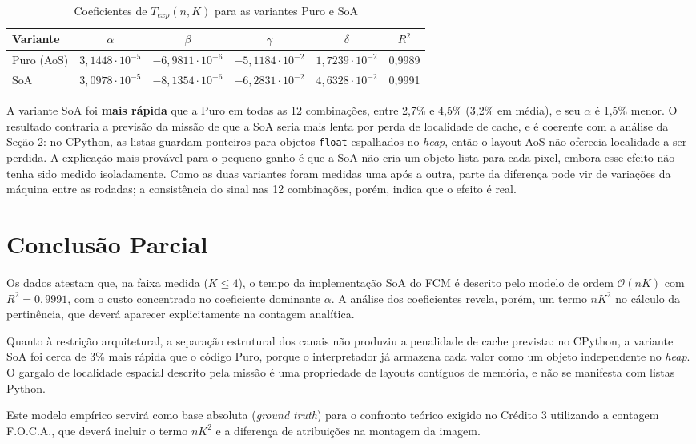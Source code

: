 \documentclass[11pt,a4paper]{article}
\begin{document}
\begin{table}[h!]
\centering
\caption{Coeficientes de $T_{exp}(n, K)$ para as variantes Puro e SoA}
\label{tab:comparacao}
\begin{tabular}{@{}lccccc@{}}
\toprule
\textbf{Variante} & $\alpha$ & $\beta$ & $\gamma$ & $\delta$ & $R^2$ \\ \midrule
Puro (AoS) & $3{,}1448 \cdot 10^{-5}$ & $-6{,}9811 \cdot 10^{-6}$ & $-5{,}1184 \cdot 10^{-2}$ & $1{,}7239 \cdot 10^{-2}$ & 0,9989 \\
SoA & $3{,}0978 \cdot 10^{-5}$ & $-8{,}1354 \cdot 10^{-6}$ & $-6{,}2831 \cdot 10^{-2}$ & $4{,}6328 \cdot 10^{-2}$ & 0,9991 \\ \bottomrule
\end{tabular}
\end{table}

A variante SoA foi \textbf{mais rápida} que a Puro em todas as 12 combinações, entre 2,7\% e 4,5\% (3,2\% em média), e seu $\alpha$ é 1,5\% menor. O resultado contraria a previsão da missão de que a SoA seria mais lenta por perda de localidade de cache, e é coerente com a análise da Seção 2: no CPython, as listas guardam ponteiros para objetos \texttt{float} espalhados no \textit{heap}, então o layout AoS não oferecia localidade a ser perdida. A explicação mais provável para o pequeno ganho é que a SoA não cria um objeto lista para cada pixel, embora esse efeito não tenha sido medido isoladamente. Como as duas variantes foram medidas uma após a outra, parte da diferença pode vir de variações da máquina entre as rodadas; a consistência do sinal nas 12 combinações, porém, indica que o efeito é real.

\section{Conclusão Parcial}
Os dados atestam que, na faixa medida ($K \le 4$), o tempo da implementação SoA do FCM é descrito pelo modelo de ordem $\mathcal{O}(nK)$ com $R^2 = 0{,}9991$, com o custo concentrado no coeficiente dominante $\alpha$. A análise dos coeficientes revela, porém, um termo $nK^2$ no cálculo da pertinência, que deverá aparecer explicitamente na contagem analítica.

Quanto à restrição arquitetural, a separação estrutural dos canais não produziu a penalidade de cache prevista: no CPython, a variante SoA foi cerca de 3\% mais rápida que o código Puro, porque o interpretador já armazena cada valor como um objeto independente no \textit{heap}. O gargalo de localidade espacial descrito pela missão é uma propriedade de layouts contíguos de memória, e não se manifesta com listas Python.

Este modelo empírico servirá como base absoluta (\textit{ground truth}) para o confronto teórico exigido no Crédito 3 utilizando a contagem F.O.C.A., que deverá incluir o termo $nK^2$ e a diferença de atribuições na montagem da imagem.
\end{document}
